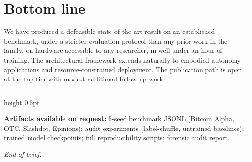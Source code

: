 \documentclass[11pt,a4paper]{article}
\begin{document}
\section{Bottom line}

We have produced a defensible state-of-the-art result on an
established benchmark, under a stricter evaluation protocol than
any prior work in the family, on hardware accessible to any
researcher, in well under an hour of training. The architectural
framework extends naturally to embodied autonomy applications and
resource-constrained deployment. The publication path is open at
the top tier with modest additional follow-up work.

\vspace{1em}
\hrule height 0.5pt
\vspace{0.5em}

\noindent\textbf{Artifacts available on request:} 5-seed benchmark
JSONL (Bitcoin Alpha, OTC, Slashdot, Epinions); audit experiments
(label-shuffle, untrained baselines); trained model checkpoints;
full reproducibility scripts; forensic audit report.

\vspace{0.5em}
\textit{End of brief.}
\end{document}
